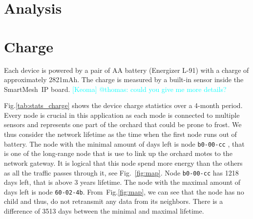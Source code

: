 \documentclass{sig-alternate}
\newcommand{\keoma}[1]              {\textcolor{cyan}{[Keoma] #1}}
\newcommand{\smip}                  {SmartMesh~IP\xspace}
\begin{document}
\section{Analysis}
\label{sec:analysis}

\section{Charge}
\label{sec:charge}


Each device is powered by a pair of AA battery (Energizer L-91) with a charge of approximately 2821mAh.
The charge is measured by a built-in sensor inside the \smip board. \keoma{@thomas: could you give me more details?}


Fig.\ref{tab:stats_charge} shows the device charge statistics over a 4-month period.
Every node is crucial in this application as each mode is connected to multiple sensors and represents one part of the orchard that could be prone to frost.
We thus consider the network lifetime as the time when the first node runs out of battery.
The node with the minimal amount of days left is node {\tt b0-00-cc} , that is one of the long-range node that is use to link up the orchard motes to the network gateway.
It is logical that this node spend more energy than the others as all the traffic passes through it, see Fig.~\ref{fig:map}.
Node {\tt b0-00-cc} has 1218 days left, that is above 3 years lifetime.
The node with the maximal amount of days left is node {\tt 60-02-4b}.
From~Fig.\ref{fig:map}, we can see that the node has no child and thus, do not retransmit any data from its neighbors.
There is a difference of 3513 days between the minimal and maximal lifetime.
\end{document}

